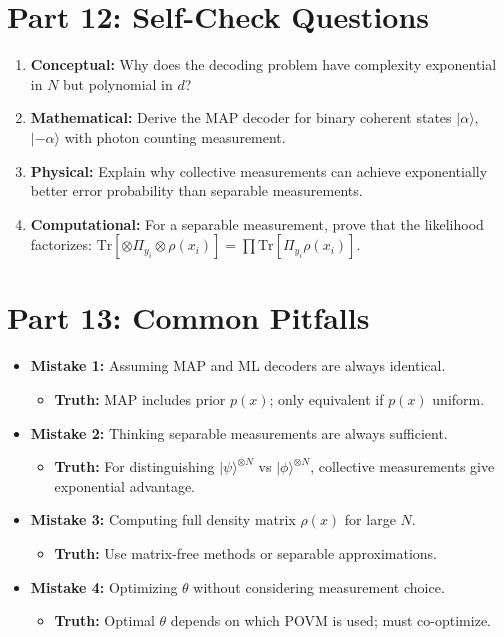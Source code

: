 \documentclass[11pt,a4paper]{article}
\begin{document}
\section{Part 12: Self-Check Questions}

\begin{enumerate}
    \item \textbf{Conceptual:} Why does the decoding problem have complexity exponential in $N$ but polynomial in $d$?
    \item \textbf{Mathematical:} Derive the MAP decoder for binary coherent states $|\alpha\rangle$, $|-\alpha\rangle$ with photon counting measurement.
    \item \textbf{Physical:} Explain why collective measurements can achieve exponentially better error probability than separable measurements.
    \item \textbf{Computational:} For a separable measurement, prove that the likelihood factorizes: $\text{Tr}[\otimes\Pi_{y_i} \otimes \rho(x_i)] = \prod \text{Tr}[\Pi_{y_i}\rho(x_i)]$.
\end{enumerate}

\section{Part 13: Common Pitfalls}

\begin{itemize}
    \item \textbf{Mistake 1:} Assuming MAP and ML decoders are always identical.
    \begin{itemize}
        \item \textbf{Truth:} MAP includes prior $p(x)$; only equivalent if $p(x)$ uniform.
    \end{itemize}
    \item \textbf{Mistake 2:} Thinking separable measurements are always sufficient.
    \begin{itemize}
        \item \textbf{Truth:} For distinguishing $|\psi\rangle^{\otimes N}$ vs $|\phi\rangle^{\otimes N}$, collective measurements give exponential advantage.
    \end{itemize}
    \item \textbf{Mistake 3:} Computing full density matrix $\rho(x)$ for large $N$.
    \begin{itemize}
        \item \textbf{Truth:} Use matrix-free methods or separable approximations.
    \end{itemize}
    \item \textbf{Mistake 4:} Optimizing $\theta$ without considering measurement choice.
    \begin{itemize}
        \item \textbf{Truth:} Optimal $\theta$ depends on which POVM is used; must co-optimize.
    \end{itemize}
\end{itemize}
\end{document}
